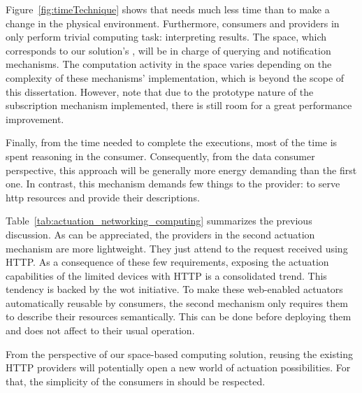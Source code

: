 
Figure~\ref{fig:timeTechnique} shows that \spaceActuation{} needs much less time than \restActuation{} to make a change in the physical environment.
Furthermore, consumers and providers in \spaceActuation{} only perform trivial computing task: interpreting results. %
The space, which corresponds to our solution's \coordspace{}, will be in charge of querying and notification mechanisms.
The computation activity in the space varies depending on the complexity of these mechanisms' implementation, which is beyond the scope of this dissertation.
However, note that due to the prototype nature of the subscription mechanism implemented, there is still room for a great performance improvement. %


Finally, from the time needed to complete the \restActuation{} executions, most of the time is spent reasoning in the consumer.
Consequently, from the data consumer perspective, this approach will be generally more energy demanding than the first one. %
In contrast, this mechanism demands few things to the provider: to serve \ac{http} resources and provide their descriptions. %


\bigskip





Table~\ref{tab:actuation_networking_computing} summarizes the previous discussion.
As can be appreciated, the providers in the second actuation mechanism are more lightweight.
They just attend to the request received using HTTP.
As a consequence of these few requirements, exposing the actuation capabilities of the limited devices with HTTP is a consolidated trend.
This tendency is backed by the \ac{wot} initiative.
To make these web-enabled actuators automatically reusable by consumers, the second mechanism only requires them to describe their resources semantically.
This can be done before deploying them and does not affect to their usual operation.


From the perspective of our space-based computing solution, reusing the existing HTTP providers will potentially open a new world of actuation possibilities.
For that, the simplicity of the consumers in \spaceActuation{} should be respected. %


